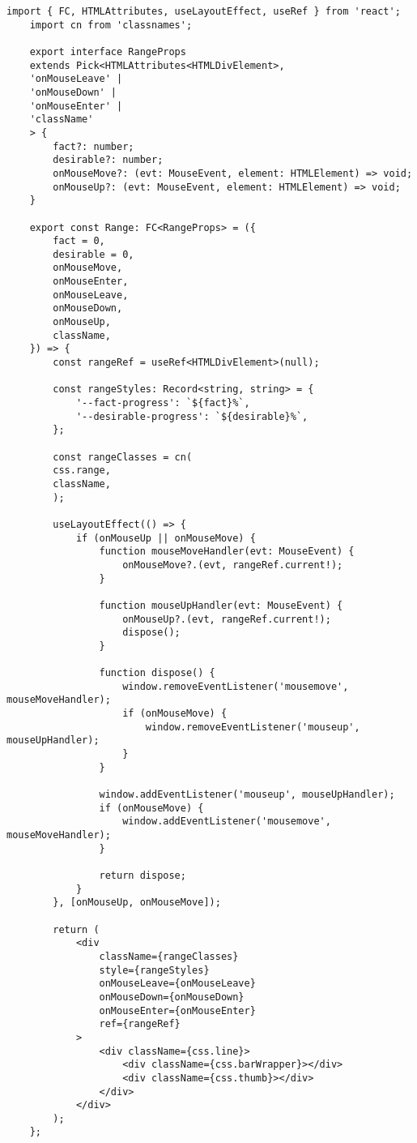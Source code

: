 \begin{lstlisting}[caption={Range.tsx}]
	import { FC, HTMLAttributes, useLayoutEffect, useRef } from 'react';
	import cn from 'classnames';
	
	export interface RangeProps
	extends Pick<HTMLAttributes<HTMLDivElement>,
	'onMouseLeave' |
	'onMouseDown' |
	'onMouseEnter' |
	'className'
	> {
		fact?: number;
		desirable?: number;
		onMouseMove?: (evt: MouseEvent, element: HTMLElement) => void;
		onMouseUp?: (evt: MouseEvent, element: HTMLElement) => void;
	}
	
	export const Range: FC<RangeProps> = ({
		fact = 0,
		desirable = 0,
		onMouseMove,
		onMouseEnter,
		onMouseLeave,
		onMouseDown,
		onMouseUp,
		className,
	}) => {
		const rangeRef = useRef<HTMLDivElement>(null);    
		
		const rangeStyles: Record<string, string> = {
			'--fact-progress': `${fact}%`,
			'--desirable-progress': `${desirable}%`,
		};
		
		const rangeClasses = cn(
		css.range,
		className,
		);
		
		useLayoutEffect(() => {
			if (onMouseUp || onMouseMove) {
				function mouseMoveHandler(evt: MouseEvent) {
					onMouseMove?.(evt, rangeRef.current!);
				}
				
				function mouseUpHandler(evt: MouseEvent) {
					onMouseUp?.(evt, rangeRef.current!);
					dispose();
				}
				
				function dispose() {
					window.removeEventListener('mousemove', mouseMoveHandler);
					if (onMouseMove) {
						window.removeEventListener('mouseup', mouseUpHandler);
					}
				}
				
				window.addEventListener('mouseup', mouseUpHandler);
				if (onMouseMove) {
					window.addEventListener('mousemove', mouseMoveHandler);
				}
				
				return dispose;
			}
		}, [onMouseUp, onMouseMove]);
		
		return (
			<div
				className={rangeClasses}
				style={rangeStyles}
				onMouseLeave={onMouseLeave}
				onMouseDown={onMouseDown}
				onMouseEnter={onMouseEnter}
				ref={rangeRef}
			>
				<div className={css.line}>
					<div className={css.barWrapper}></div>
					<div className={css.thumb}></div>
				</div>
			</div>
		);
	};
\end{lstlisting}

